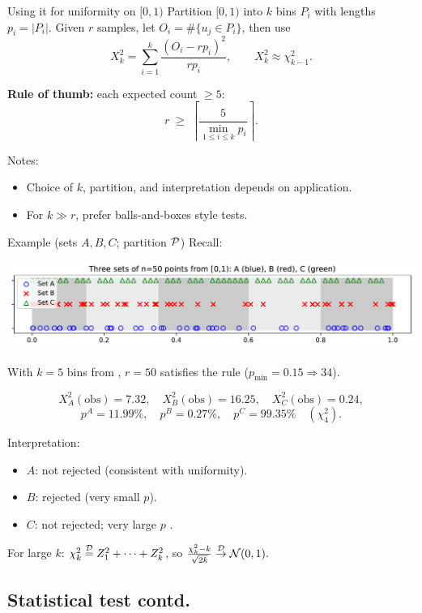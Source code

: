 \documentclass[aspectratio=169]{beamer}
\begin{document}
\begin{frame}{Using it for uniformity on \([0,1)\)}
Partition \( [0,1) \) into \(k\) bins \(P_i\) with lengths \(p_i=|P_i|\).
Given \(r\) samples, let \(O_i=\#\{u_j\in P_i\}\), then use
\[
X_k^2=\sum_{i=1}^k \frac{(O_i-rp_i)^2}{rp_i}, \qquad X_k^2 \approx \chi^2_{k-1}.
\]

\textbf{Rule of thumb:} each expected count \(\ge 5\):
\[
r \;\ge\; \left\lceil \frac{5}{\displaystyle \min_{1\le i\le k} p_i}\right\rceil.
\]

Notes:
\begin{itemize}
  \item Choice of \(k\), partition, and interpretation depends on application.
  \item For \(k\gg r\), prefer balls-and-boxes style tests.
\end{itemize}
\end{frame}

\begin{frame}{Example (sets \(A,B,C\); partition \({\cal P}\))}
Recall:
\begin{center}
\includegraphics[width=0.6\linewidth]{figures_pdf/ch2_prng_sets_A_B_C_points_plot.pdf}
\end{center}

With \(k=5\) bins from  , \(r=50\) satisfies the rule (\(p_{\min}=0.15\Rightarrow 34\)).

\[
X_A^2(\text{obs})=7.32,\quad
X_B^2(\text{obs})=16.25,\quad
X_C^2(\text{obs})=0.24,
\]
\[
p^A=11.99\%,\quad p^B=0.27\%,\quad p^C=99.35\% \quad (\chi^2_4).
\]

Interpretation:
\begin{itemize}
  \item \(A\): not rejected (consistent with uniformity).
  \item \(B\): rejected (very small \(p\)).
  \item \(C\): not rejected; very large \(p\) .
\end{itemize}

For large \(k\): \(\chi^2_k \stackrel{\cal D}{=} Z_1^2+\cdots+Z_k^2\), so
$
\frac{\chi^2_k - k}{\sqrt{2k}} \stackrel{\cal D}{\rightarrow} \mathcal{N}(0,1).
$
\end{frame}


\subsection{Statistical test contd.}
\end{document}
